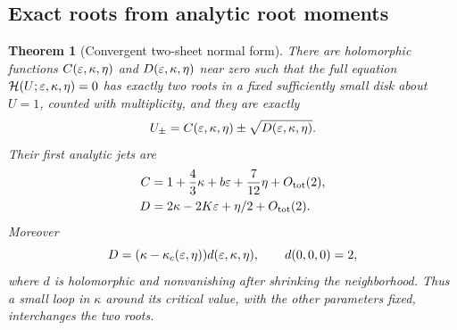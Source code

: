 \documentclass[11pt,a4paper]{article}
\numberwithin{equation}{section}
\newtheorem{theorem}{Theorem}[section]
\theoremstyle{definition}\newtheorem{definition}[theorem]{Definition}
\theoremstyle{remark}\newtheorem{remark}[theorem]{Remark}
\newcommand{\HH}{\mathcal H}
\newcommand{\Ot}{O_{\mathrm{tot}}}
\begin{document}
\subsection{Exact roots from analytic root moments}
\begin{theorem}[Convergent two-sheet normal form]\label{thm:twosheet}
There are holomorphic functions $C(\varepsilon,\kappa,\eta)$ and
$D(\varepsilon,\kappa,\eta)$ near zero such that the full equation
$\HH(U;\eps,\kappa,\eta)=0$ has exactly two roots in a fixed sufficiently
small disk about $U=1$, counted with multiplicity, and they are exactly
\begin{equation}\label{eq:CD}
 U_\pm=C(\varepsilon,\kappa,\eta)\pm\sqrt{D(\varepsilon,\kappa,\eta)}.
\end{equation}
Their first analytic jets are
\begin{align}
 C&=1+\frac43\kappa+b\eps+\frac7{12}\eta+\Ot(2),\label{eq:Cjet}\\
 D&=2\kappa-2K\eps+\eta/2+\Ot(2).\label{eq:Djet}
\end{align}
Moreover
\begin{equation}\label{eq:Dfactor}
 D=(\kappa-\kappa_c(\varepsilon,\eta))d(\varepsilon,\kappa,\eta),
 \qquad d(0,0,0)=2,
\end{equation}
where $d$ is holomorphic and nonvanishing after shrinking the neighborhood.
Thus a small loop in $\kappa$ around its critical value, with the other
parameters fixed, interchanges the two roots.
\end{theorem}
\end{document}
